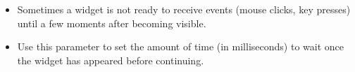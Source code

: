 
\begin{itemize}
\item Sometimes a widget is not ready to receive events (mouse clicks, key presses) until a few moments after becoming visible.
\item Use this parameter to set the amount of time (in milliseconds) to wait once the widget has appeared before continuing.
\end{itemize}

